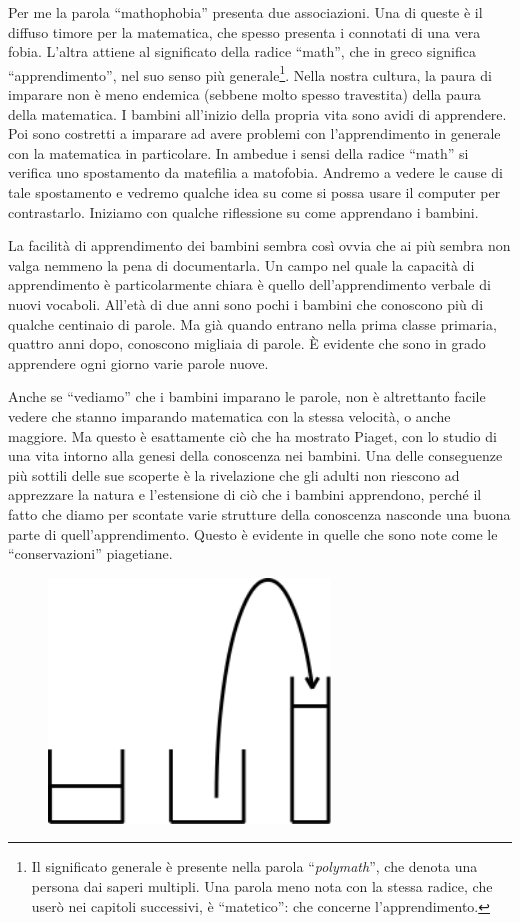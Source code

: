 Per me la parola “mathophobia” presenta due associazioni. Una di queste è il diffuso timore per la matematica, che spesso presenta i connotati di una vera fobia. L'altra attiene al significato della radice “math”, che in greco significa “apprendimento”, nel suo senso più generale\footnote{Il significato generale è presente nella parola “\textit{polymath}”, che denota una persona dai saperi multipli. Una parola meno nota con la stessa radice, che userò nei capitoli successivi, è “matetico”: che concerne l'apprendimento.}.  Nella nostra cultura, la paura di imparare non è meno endemica (sebbene molto spesso travestita) della paura della matematica. I bambini all'inizio della propria vita sono avidi di apprendere. Poi sono costretti a imparare ad avere problemi con l'apprendimento in generale con la matematica in particolare. In ambedue i sensi della radice “math” si verifica uno spostamento da matefilia a matofobia. Andremo a vedere le cause di tale spostamento e vedremo qualche idea su come si possa usare il computer per contrastarlo. Iniziamo con qualche riflessione su come apprendano i bambini.

La facilità di apprendimento dei bambini sembra così ovvia che ai più sembra non valga nemmeno la pena di documentarla. Un campo nel quale la capacità di apprendimento è particolarmente chiara è quello dell'apprendimento verbale di nuovi vocaboli. All'età di due anni sono pochi i bambini che conoscono più di qualche centinaio di parole. Ma già quando entrano nella prima classe primaria, quattro anni dopo, conoscono migliaia di parole. È evidente che sono in grado apprendere ogni giorno varie parole nuove. 

Anche se “vediamo” che i bambini imparano le parole, non è altrettanto facile vedere che stanno imparando matematica con la stessa velocità, o anche maggiore. Ma questo è esattamente ciò che ha mostrato Piaget, con lo studio di una vita intorno alla genesi della conoscenza nei bambini. Una delle conseguenze più sottili delle sue scoperte è la rivelazione che gli adulti non riescono ad apprezzare la natura e l'estensione di ciò che i bambini apprendono, perché il fatto che diamo per scontate varie strutture della conoscenza nasconde una buona parte di quell'apprendimento. Questo è evidente in quelle che sono note come le “conservazioni” piagetiane.

\begin{figure}
   \centering
   \includegraphics[width=7.5cm]{./images/papert-1/220px-Fig-2-mindstorms.png}
   \label{pap-1-1}
\end{figure}

